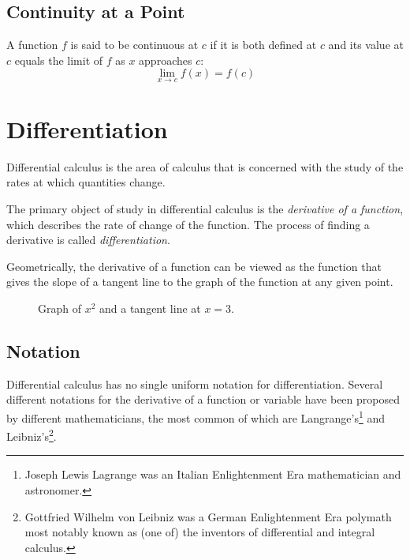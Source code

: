 \documentclass[headings=standardclasses]{scrreprt}
\begin{document}
\section{Continuity at a Point}

A function \(f\) is said to be continuous at \(c\) if it is both defined at
\(c\) and its value at \(c\) equals the limit of \(f\) as \(x\) approaches
\(c\): \[ \lim_{x → c} f(x) = f(c) \]

\chapter{Differentiation}

Differential calculus is the area of calculus that is concerned with the study
of the rates at which quantities change.

The primary object of study in differential calculus is the \emph{derivative of
  a function}, which describes the rate of change of the function. The process
of finding a derivative is called \emph{differentiation}.

Geometrically, the derivative of a function can be viewed as the function that
gives the slope of a tangent line to the graph of the function at any given
point.

\begin{figure}[h]
  \centering


  \caption{Graph of \(x^{2}\) and a tangent line at \(x = 3\).}
\end{figure}

\section{Notation}

Differential calculus has no single uniform notation for differentiation.
Several different notations for the derivative of a function or variable have
been proposed by different mathematicians, the most common of which are
Langrange's\footnote{Joseph Lewis Lagrange was an Italian Enlightenment Era
  mathematician and astronomer.} and Leibniz's\footnote{Gottfried Wilhelm von
  Leibniz was a German Enlightenment Era polymath most notably known as (one of)
  the inventors of differential and integral calculus.}.
\end{document}
